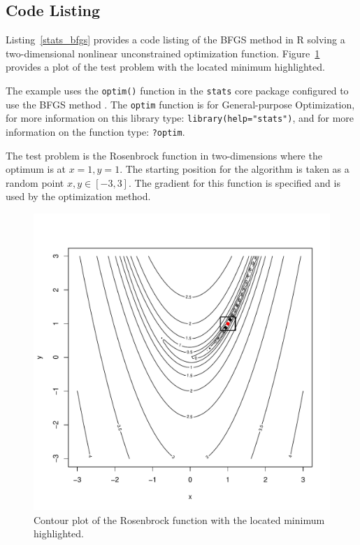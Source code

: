 \subsection{Code Listing}
Listing~\ref{stats_bfgs} provides a code listing of the BFGS method in R solving a two-dimensional nonlinear unconstrained optimization function. Figure~\ref{plot:bfgs_result} provides a plot of the test problem with the located minimum highlighted.

The example uses the \texttt{optim()} function in the \texttt{stats} core package configured to use the BFGS method \cite{RDevelopmentCoreTeam2011a}. The \texttt{optim} function is for General-purpose Optimization, for more information on this library type: \texttt{library(help="stats")}, and for more information on the function type: \texttt{?optim}.

The test problem is the Rosenbrock function in two-dimensions where the optimum is at $x=1,y=1$. The starting position for the algorithm is taken as a random point $x,y \in [-3,3]$. The gradient for this function is specified and is used by the optimization method.




\begin{figure}[htp]
\centering
\includegraphics[scale=0.45]{a_optimization/bfgs_result.pdf}
\caption{Contour plot of the Rosenbrock function with the located minimum highlighted.}
\label{plot:bfgs_result}
\end{figure}

